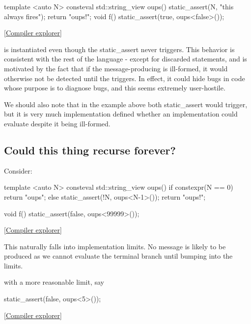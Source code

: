 \documentclass{wg21}
\begin{document}
\begin{colorblock}
    template <auto N>
    consteval std::string_view oups() {
        static_assert(N, "this always fires");
        return "oups!";
    }
    void f() {
        static_assert(true, oups<false>());
    }
\end{colorblock}

\href{https://godbolt.org/z/PdvKsjTxq}{[Compiler explorer]}

 is instantiated even though the static_assert never triggers.
This behavior is consistent with the rest of the language - except for discarded statements, and is motivated by the fact that if the message-producing
is ill-formed, it would otherwise not be detected until the  triggers. In effect, it could hide bugs in code whose purpose is to diagnose bugs,
and this seems extremely user-hostile.

We should also note that in the example above both static_assert would trigger, but it is very much implementation defined whether an implementation could
evaluate  despite it being ill-formed.

\subsection{Could this thing recurse forever?}

Consider:

\begin{colorblock}
    template <auto N>
    consteval std::string_view oups() {
        if constexpr(N == 0)
        return "oups";
        else
        static_assert(!N, oups<N-1>());
        return "oups!";
    }

    void f() {
        static_assert(false, oups<99999>());
    }
\end{colorblock}

\href{https://godbolt.org/z/Kc9cPbqz6}{[Compiler explorer]}

This naturally falls into implementation limits.
No message is likely to be produced as we cannot evaluate the terminal branch until bumping into the limits.

with a more reasonable limit, say

\begin{colorblock}
    static_assert(false, oups<5>());
\end{colorblock}

\href{https://godbolt.org/z/eqsj6GavG}{[Compiler explorer]}
\end{document}
